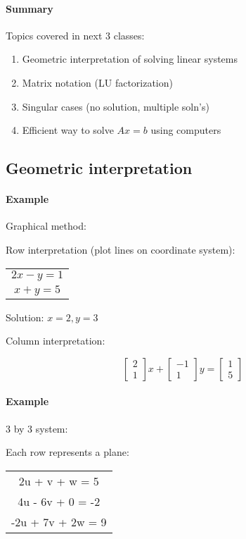 \paragraph{Summary}
Topics covered in next 3 classes:
\begin{enumerate}
	\item Geometric interpretation of solving linear systems
	\item Matrix notation (LU factorization)
	\item Singular cases (no solution, multiple soln's)
	\item Efficient way to solve $Ax=b$ using computers
\end{enumerate}

\subsection{Geometric interpretation}

\paragraph{Example} Graphical method:

Row interpretation (plot lines on coordinate system):

\begin{tabular}{c}
	$2x - y = 1$ \\
	$x + y = 5$
\end{tabular}
Solution: $x=2,y=3$

Column interpretation:

$$ \begin{bmatrix}
	2 \\ 1
\end{bmatrix} x + 
\begin{bmatrix}
	-1 \\ 1
\end{bmatrix} y =
\begin{bmatrix}
	1 \\ 5
\end{bmatrix}$$

\paragraph{Example} 3 by 3 system:

Each row represents a plane:

\begin{tabular}{c}
	2u + v + w = 5 \\
	4u - 6v + 0 = -2 \\
	-2u + 7v + 2w = 9
\end{tabular}

